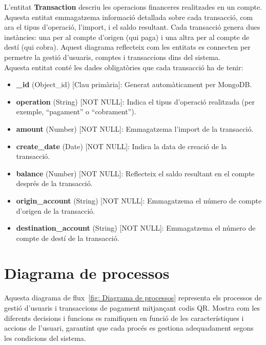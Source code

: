 \documentclass[a4paper,12pt,twoside]{ThesisStyle}
\begin{document}
L'entitat \textbf{Transaction} descriu les operacions financeres realitzades en un compte. Aquesta entitat emmagatzema informació detallada sobre cada transacció, com ara el tipus d'operació, l'import, i el saldo resultant. Cada transacció genera dues instàncies: una per al compte d'origen (qui paga) i una altra per al compte de destí (qui cobra). Aquest diagrama reflecteix com les entitats es connecten per permetre la gestió d'usuaris, comptes i transaccions dins del sistema.\\

Aquesta entitat conté les dades obligatòries que cada transacció ha de tenir:

\begin{itemize}
    \item \textbf{\_id} (Object\_id) [Clau primària]: Generat automàticament per MongoDB.
    \item \textbf{operation} (String) [NOT NULL]: Indica el tipus d'operació realitzada (per exemple, ``pagament'' o ``cobrament'').
    \item \textbf{amount} (Number) [NOT NULL]: Emmagatzema l'import de la transacció.
    \item \textbf{create\_date} (Date) [NOT NULL]: Indica la data de creació de la transacció.
    \item \textbf{balance} (Number) [NOT NULL]: Reflecteix el saldo resultant en el compte després de la transacció.
    \item \textbf{origin\_account} (String) [NOT NULL]: Emmagatzema el número de compte d'origen de la transacció.
    \item \textbf{destination\_account} (String) [NOT NULL]: Emmagatzema el número de compte de destí de la transacció.
\end{itemize}


\section{Diagrama de processos}
\label{ sec: Diagrama de processos }

Aquesta diagrama de flux~\ref{fig: Diagrama de processos} representa els processos de gestió d'usuaris i transaccions de pagament mitjançant codis QR. Mostra com les diferents decisions i funcions es ramifiquen en funció de les característiques i accions de l'usuari, garantint que cada procés es gestiona adequadament segons les condicions del sistema.


\clearpage
\end{document}
